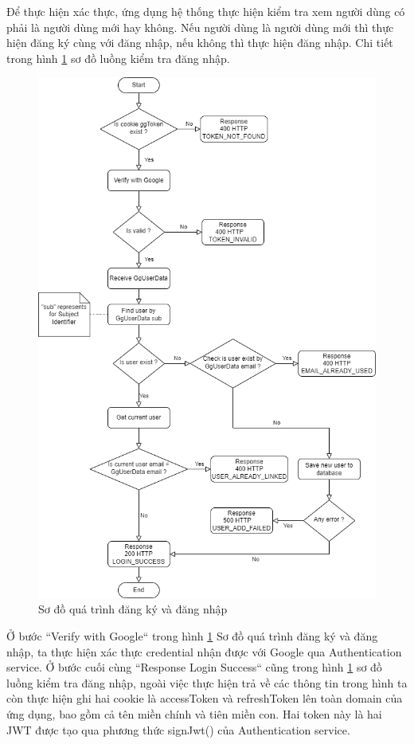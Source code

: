 Để thực hiện xác thực, ứng dụng hệ thống thực hiện kiểm tra xem người dùng có phải là người dùng mới hay không.
Nếu người dùng là người dùng mới thì thực hiện đăng ký cùng với đăng nhập, nếu không thì thực hiện đăng nhập.
Chi tiết trong hình \ref{fig:SignUpIn} sơ đồ luồng kiểm tra đăng nhập.

\begin{figure}[H]
  \centering
  \includegraphics[width=\textwidth]{applied-thesis-chapters/chapter-4/Sơ đồ quá trình đăng ký và đăng nhập.png}
  \caption{Sơ đồ quá trình đăng ký và đăng nhập}
  \label{fig:SignUpIn}
\end{figure}

Ở bước “Verify with Google“ trong hình \ref{fig:SignUpIn} Sơ đồ quá trình đăng ký và đăng nhập, ta thực hiện xác thực credential nhận được với Google qua Authentication service.
Ở bước cuối cùng “Response Login Success“ cũng trong hình \ref{fig:SignUpIn} sơ đồ luồng kiểm tra đăng nhập, ngoài việc thực hiện trả về các thông tin trong hình ta còn thực hiện ghi hai cookie là accessToken và refreshToken lên toàn domain của ứng dụng, bao gồm cả tên miền chính và tiên miền con. Hai token này là hai JWT được tạo qua phương thức signJwt() của Authentication service.

